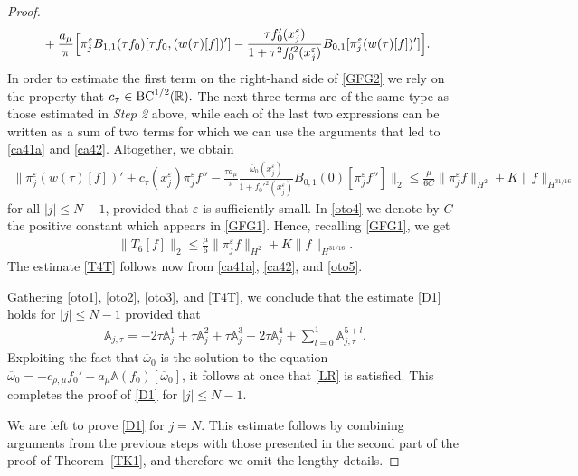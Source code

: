 \documentclass[11pt,reqno]{amsart}
\numberwithin{equation}{section}
\newcommand{\0}{\Omega}
\newcommand{\e}{\varepsilon}
\newcommand{\ov}{\overline}
\newcommand{\oo}{\ov\omega}
\newcommand{\bA}{\mathbb{A}}
\newcommand{\R}{\mathbb{R}}
\numberwithin{equation}{section}
\begin{document}
\begin{proof}
\begin{align}
 &\hspace{0.424cm}+\frac{a_\mu}{\pi}\Big[\pi_j^\e B_{1,1}(\tau f_0)[\tau f_0,(w(\tau)[f])'] -\frac{ \tau f_0'(x_j^\e) }{ 1+ \tau^2 f_0'^2(x_j^\e) }B_{0,1}[\pi_j^\e (w(\tau)[f])']\Big]. \label{GFG2}
\end{align}
In order to  estimate the first  term   on the right-hand side of \eqref{GFG2}  we rely on the property that $c_\tau\in {\rm BC}^{1/2}(\R).$
The next three terms  are of the same type as those estimated in  {\em Step 2} above,  while each of  the last two expressions can be written as a sum of two terms for
which we can use the arguments that led to \eqref{ca41a} and \eqref{ca42}.
Altogether, we obtain 
\begin{align} 
 \Big\|\pi_j^\e(w(\tau)[f])'+c_\tau(x_j^\e)\pi_j^\e f''-\frac{\tau a_\mu}{\pi}\frac{\oo_0(x_j^\e)}{ 1+ f_0'^2(x_j^\e) }B_{0,1}(0)[\pi_j^\e f'']\Big\|_{2}\leq \frac{\mu}{6C}\|\pi_j^\e f\|_{H^2} +K\|f\|_{H^{31/16}}\label{oto4}
\end{align}
for all $|j|\leq N-1$, provided that $\e$ is sufficiently small. 
In \eqref{oto4} we denote  by $C$ the positive constant which appears in \eqref{GFG1}. 
Hence, recalling \eqref{GFG1}, we get 
\begin{align}
 \|T_6[f]\|_2\leq \frac{\mu}{6}\|\pi_j^\e f\|_{H^2} +K\|f\|_{H^{31/16}}\label{oto5}.
\end{align} 
The estimate \eqref{T4T} follows now from \eqref{ca41a}, \eqref{ca42}, and \eqref{oto5}.\medskip

  Gathering \eqref{oto1}, \eqref{oto2},  \eqref{oto3}, and \eqref{T4T}, we conclude that the estimate \eqref{D1} holds for $|j|\leq N-1$ provided that
\begin{align}\label{LR}
 \bA_{j,\tau} =-2\tau \bA_{j}^1+\tau\bA_{j}^2+\tau \bA_{j}^3-2\tau \bA_{j }^4+\sum_{l=0}^1 \bA_{j,\tau}^{5+l}.
\end{align}
Exploiting the fact that $\oo_0$  is the solution to the   equation $\oo_0=-c_{\rho,\mu}f_0'-a_\mu\bA(f_0)[\oo_0]$,  it follows at once that \eqref{LR} is satisfied. 
This completes the proof of \eqref{D1} for $|j|\leq N-1.$\medskip

  We are left to prove \eqref{D1} for $j=N.$ This estimate  follows   by combining arguments from the previous steps with those presented in the second part of the proof of Theorem~\ref{TK1}, 
 and therefore we omit    the lengthy details.
\end{proof} 
\end{document}
